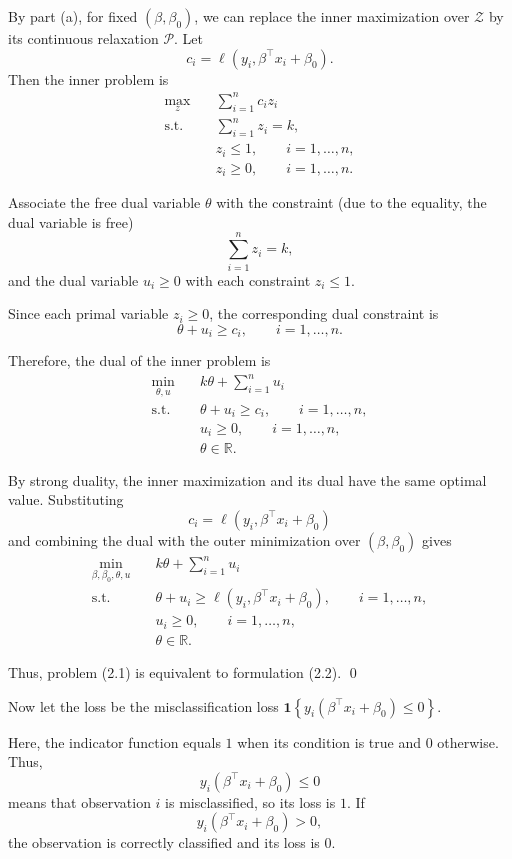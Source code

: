 \documentclass{article}
\begin{document}
By part (a), for fixed $(\beta,\beta_0)$, we can replace the inner
maximization over $\mathcal Z$ by its continuous relaxation $\mathcal P$.
Let
\[
c_i=\ell(y_i,\beta^\top x_i+\beta_0).
\]
Then the inner problem is
\[
\begin{aligned}
\max_{z}\quad
& \sum_{i=1}^n c_i z_i\\
\text{s.t.}\quad
& \sum_{i=1}^n z_i=k,\\
& z_i\leq 1, \qquad i=1,\ldots,n,\\
& z_i\geq 0, \qquad i=1,\ldots,n.
\end{aligned}
\]

Associate the free dual variable $\theta$ with the  constraint (due to the equality, the dual variable is free)
\[
\sum_{i=1}^n z_i=k,
\]
and the dual variable $u_i\geq0$ with each constraint $z_i\leq1$.

Since each primal variable $z_i\geq0$, the corresponding dual constraint is
\[
\theta+u_i\geq c_i,
\qquad i=1,\ldots,n.
\]

Therefore, the dual of the inner problem is
\[
\begin{aligned}
\min_{\theta,u}\quad
& k\theta+\sum_{i=1}^n u_i\\
\text{s.t.}\quad
& \theta+u_i\geq c_i,
\qquad i=1,\ldots,n,\\
& u_i\geq0,
\qquad i=1,\ldots,n,\\
& \theta\in\mathbb R.
\end{aligned}
\]

By strong duality, the inner maximization and its dual have the same
optimal value. Substituting
\[
c_i=\ell(y_i,\beta^\top x_i+\beta_0)
\]
and combining the dual with the outer minimization over
$(\beta,\beta_0)$ gives
\[
\boxed{
\begin{aligned}
\min_{\beta,\beta_0,\theta,u}\quad
& k\theta+\sum_{i=1}^n u_i\\
\text{s.t.}\quad
& \theta+u_i
\geq
\ell(y_i,\beta^\top x_i+\beta_0),
\qquad i=1,\ldots,n,\\
& u_i\geq0,
\qquad i=1,\ldots,n,\\
& \theta\in\mathbb R.
\end{aligned}}
\]

Thus, problem (2.1) is equivalent to formulation (2.2). \qed

\newpage

Now let the loss be the misclassification loss $
\mathbf{1}\left\{
y_i(\beta^\top x_i+\beta_0)\leq 0
\right\}.
$

Here, the indicator function equals $1$ when its condition is true and
$0$ otherwise. Thus,
\[
y_i(\beta^\top x_i+\beta_0)\leq 0
\]
means that observation $i$ is misclassified, so its loss is $1$.
If
\[
y_i(\beta^\top x_i+\beta_0)>0,
\]
the observation is correctly classified and its loss is $0$.
\end{document}
